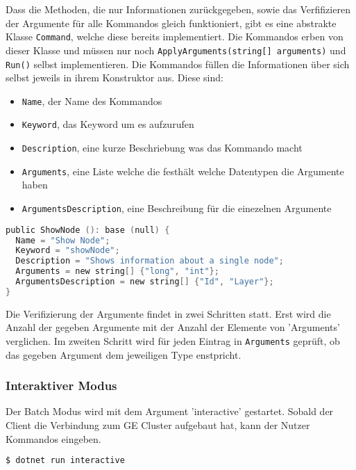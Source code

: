 Dass die Methoden, die nur Informationen zurückgegeben, sowie das Verfifizieren der Argumente für alle Kommandos gleich funktioniert, gibt es eine abstrakte Klasse
\verb|Command|, welche diese bereits implementiert. Die Kommandos erben von dieser Klasse und müssen nur noch \verb|ApplyArguments(string[] arguments)| und \verb|Run()| selbst implementieren.
Die Kommandos füllen die Informationen über sich selbst jeweils in ihrem Konstruktor aus. Diese sind:

\begin{itemize}
  \item \verb|Name|, der Name des Kommandos
  \item \verb|Keyword|, das Keyword um es aufzurufen
  \item \verb|Description|, eine kurze Beschriebung was das Kommando macht
  \item \verb|Arguments|, eine Liste welche die festhält welche Datentypen die Argumente haben
  \item \verb|ArgumentsDescription|, eine Beschreibung für die einezelnen Argumente
\end{itemize}

\begin{lstlisting}[language=c, caption={Konstruktor des ShowNode Kommandos}]
public ShowNode (): base (null) {
  Name = "Show Node";
  Keyword = "showNode";
  Description = "Shows information about a single node";
  Arguments = new string[] {"long", "int"};
  ArgumentsDescription = new string[] {"Id", "Layer"};
}
\end{lstlisting}


Die Verifizierung der Argumente findet in zwei Schritten statt. Erst wird die Anzahl der gegeben Argumente mit der Anzahl der Elemente von 'Arguments' verglichen.
Im zweiten Schritt wird für jeden Eintrag in \verb|Arguments| geprüft, ob das gegeben Argument dem jeweiligen Type enstpricht.





\subsubsection{Interaktiver Modus}

Der Batch Modus wird mit dem Argument 'interactive' gestartet. Sobald der Client die Verbindung zum GE Cluster aufgebaut hat, kann der Nutzer Kommandos eingeben.


\begin{lstlisting}[language=bash]
  $ dotnet run interactive
\end{lstlisting}


